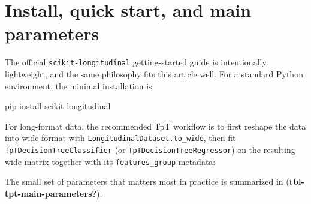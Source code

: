 \documentclass[
]{article}
\newenvironment{Shaded}{}{}
\newcommand{\ExtensionTok}[1]{#1}
\newcommand{\NormalTok}[1]{#1}
\begin{document}
\section{Install, quick start, and main
parameters}\label{install-quick-start-and-main-parameters}

The official \texttt{scikit-longitudinal} getting-started guide is
intentionally lightweight, and the same philosophy fits this article
well. For a standard Python environment, the minimal installation is:

\begin{Shaded}
\begin{Highlighting}[]
\ExtensionTok{pip}\NormalTok{ install scikit{-}longitudinal}
\end{Highlighting}
\end{Shaded}

For long-format data, the recommended TpT workflow is to first reshape
the data into wide format with \texttt{LongitudinalDataset.to\_wide},
then fit \texttt{TpTDecisionTreeClassifier} (or
\texttt{TpTDecisionTreeRegressor}) on the resulting wide matrix together
with its \texttt{features\_group} metadata:

The small set of parameters that matters most in practice is summarized
in (\textbf{tbl-tpt-main-parameters?}).
\end{document}
